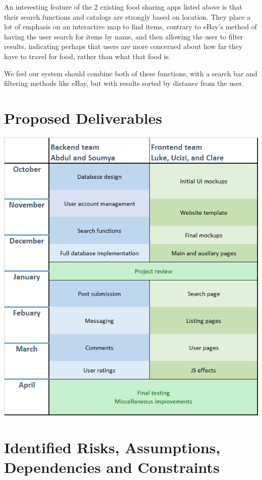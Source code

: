 \documentclass[12pt]{article}
\begin{document}
An interesting feature of the 2 existing food sharing apps listed above is that their search functions and catalogs are strongly based on location. They place a lot of emphasis on an interactive map to find items, contrary to eBay’s method of having the user search for items by name, and then allowing the user to filter results, indicating perhaps that users are more concerned about how far they have to travel for food, rather than what that food is.

We feel our system should combine both of these functions, with a search bar and filtering methods like eBay, but with results sorted by distance from the user.

\pagebreak

\section{Proposed Deliverables}
\includegraphics[width=\textwidth]{images/plan.png}
\pagebreak

\section{Identified Risks, Assumptions, Dependencies and Constraints}
\end{document}
